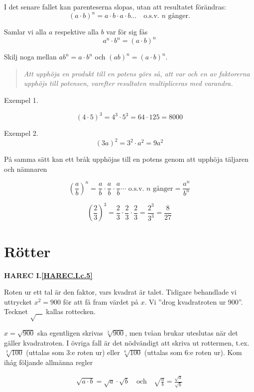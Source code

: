 I det senare fallet kan parenteserna slopas, utan att resultatet förändras:
\[
(a \cdot b)^n = a \cdot b \cdot a \cdot b \ldots
\quad \text{o.s.v. }n\text{ gånger.}
\]

Samlar vi alla \(a\) respektive alla \(b\) var för sig fås
\[a^n \cdot b^n = (a \cdot b)^n\]

Skilj noga mellan \(ab^n = a \cdot b^n\) och \((ab)^n = (a \cdot b)^n\).

\begin{quote}\emph{
Att upphöja en produkt till en potens görs så, att var och en av faktorerna
upphöjs till potensen, varefter resultaten multipliceras med varandra.
}\end{quote}

Exempel 1.

\[
(4 \cdot 5)^3 = 4^3 \cdot 5^3 = 64 \cdot 125 = 8000
\]

Exempel 2.
\[
(3a)^2 = 3^2 \cdot a^2 = 9a^2
\]

På samma sätt kan ett bråk upphöjas till en potens genom att upphöja täljaren
och nämnaren

\[
\left(\frac{a}{b}\right)^n =
\frac{a}{b} \cdot \frac{a}{b} \cdot \frac{a}{b} \cdots
\text{ o.s.v. }n\text{ gånger}
= \frac{a^n}{b^n}
\]

\[
\left(\frac{2}{3}\right)^3 = \frac{2}{3} \cdot \frac{2}{3} \cdot \frac{2}{3} =
\frac{2^3}{3^3} = \frac{8}{27}
\]

\section{Rötter}
\textbf{HAREC I.\ref{HAREC.I.c.5}\label{myHAREC.I.c.5}}

Roten ur ett tal är den faktor, vars kvadrat är talet.
Tidigare behandlade vi uttrycket \(x^2 = 900\) för att få fram värdet på \(x\). Vi
''drog kvadratroten ur 900''.
Tecknet \(\sqrt{\ \ \ \ }\) kallas rottecken.

\(x = \sqrt{900}\) ska egentligen skrivas \(\sqrt[2]{900}\),
men tvåan brukar uteslutas när det gäller kvadratroten. I övriga fall är det
nödvändigt att skriva ut rottermen, t.ex. \(\sqrt[3]{100}\) (uttalas
som 3:e roten ur) eller \(\sqrt[6]{100}\) (uttalas som 6:e roten ur).
Kom ihåg följande allmänna regler

\begin{gather*}
  \sqrt{a \cdot b} = \sqrt{a} \cdot \sqrt{b}
  \quad \text{och} \quad
  \sqrt{\frac{a}{b}} = \frac{\sqrt{a}}{\sqrt{b}}
\end{gather*}

